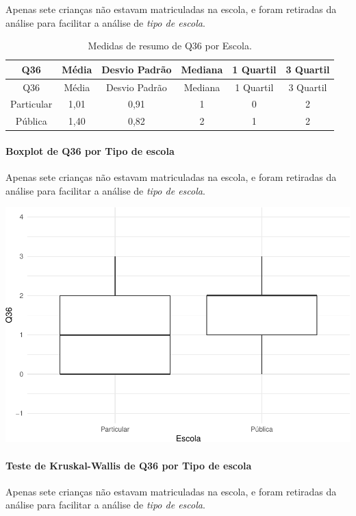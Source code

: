\documentclass[]{article}
\let\oldparagraph\paragraph
\renewcommand{\paragraph}[1]{\oldparagraph{#1}\mbox{}}
\begin{document}
Apenas sete crianças não estavam matriculadas na escola, e foram retiradas da análise para facilitar a análise de \emph{tipo de escola}.

\begin{longtable}[]{@{}cccccc@{}}
\caption{\label{tab:unnamed-chunk-1354}Medidas de resumo de Q36 por Escola.}\tabularnewline
\toprule
Q36 & Média & Desvio Padrão & Mediana & 1 Quartil & 3 Quartil\tabularnewline
\midrule
\endfirsthead
\toprule
Q36 & Média & Desvio Padrão & Mediana & 1 Quartil & 3 Quartil\tabularnewline
\midrule
\endhead
Particular & 1,01 & 0,91 & 1 & 0 & 2\tabularnewline
Pública & 1,40 & 0,82 & 2 & 1 & 2\tabularnewline
\bottomrule
\end{longtable}

\hypertarget{boxplot-de-q36-por-tipo-de-escola}{%
\paragraph{Boxplot de Q36 por Tipo de escola}\label{boxplot-de-q36-por-tipo-de-escola}}

Apenas sete crianças não estavam matriculadas na escola, e foram retiradas da análise para facilitar a análise de \emph{tipo de escola}.

\begin{center}\includegraphics[width=0.75\linewidth]{relatorio_covid19_files/figure-latex/unnamed-chunk-1355-1} \end{center}

\hypertarget{teste-de-kruskal-wallis-de-q36-por-tipo-de-escola}{%
\paragraph{Teste de Kruskal-Wallis de Q36 por Tipo de escola}\label{teste-de-kruskal-wallis-de-q36-por-tipo-de-escola}}

Apenas sete crianças não estavam matriculadas na escola, e foram retiradas da análise para facilitar a análise de \emph{tipo de escola}.
\end{document}
